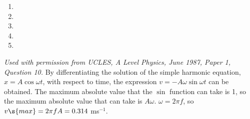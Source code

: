 
\begin{problem}[A1987PIQ10l]
{ 
\begin{enumerate}
	\item {}
	\item {}
	\item {}
	\item {}
	\item {}\correct
\end{enumerate}
}
{\textit{Used with permission from UCLES, A Level Physics, June 1987, Paper 1, Question 10.}}
{ By differentiating the solution of the simple harmonic equation, $x = A\cos{\omega t}$, with respect to time, the expression $v = -A\omega\sin{\omega t}$ can be obtained. The maximum absolute value that the $\sin$ function can take is 1, so the maximum absolute value that  can take is $A\omega$. $\omega = 2\pi f$, so $v\s{max} = 2\pi fA = 0.314$ ms$^{-1}$.
}
\end{problem}